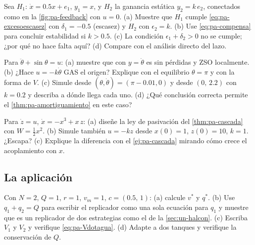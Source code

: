 \begin{problema}\label{prob:pa-escasez}
Sea $H_1$: $\dot x=0.5x+e_1$, $y_1=x$, y $H_2$ la ganancia estática $y_2=k\,e_2$, conectados como en la \cref{fig:pa-feedback} con $u=0$. (a) Muestre que $H_1$ cumple \eqref{eq:pa-excesoescasez} con $\delta_1=-0.5$ (escasez) y $H_2$ con $\epsilon_2=k$. (b) Use \eqref{eq:pa-compensa} para concluir estabilidad si $k>0.5$. (c) La condición $\epsilon_1+\delta_2>0$ no se cumple; ¿por qué no hace falta aquí? (d) Compare con el análisis directo del lazo.
\end{problema}

\begin{problema}\label{prob:pa-penduloPBC}
Para $\ddot\theta+\sin\theta=u$: (a) muestre que con $y=\dot\theta$ es sin pérdidas y ZSO localmente. (b) ¿Hace $u=-k\dot\theta$ GAS el origen? Explique con el equilibrio $\theta=\pi$ y con la forma de $V$. (c) \etiquetaM{} Simule desde $(\theta,\dot\theta)=(\pi-0.01,0)$ y desde $(0,\,2.2)$ con $k=0.2$ y describa a dónde llega cada uno. (d) ¿Qué conclusión correcta permite el \cref{thm:pa-amortiguamiento} en este caso?
\end{problema}

\begin{problema}\label{prob:pa-cascada2}
Para $\dot z=u$, $\dot x=-x^3+x\,z$: (a) diseñe la ley de pasivación del \cref{thm:pa-cascada} con $W=\tfrac12x^2$. (b) \etiquetaM{} Simule también $u=-kz$ desde $x(0)=1$, $z(0)=10$, $k=1$. ¿Escapa? (c) Explique la diferencia con el \cref{ej:pa-cascada} mirando cómo crece el acoplamiento con $x$.
\end{problema}

\subsection*{La aplicación}

\begin{problema}\label{prob:pa-dostanques}
Con $N=2$, $Q=1$, $r=1$, $v_m=1$, $c=(0.5,\,1)$: (a) calcule $v^*$ y $q^*$. (b) Use $q_1+q_2=Q$ para escribir el replicador como una sola ecuación para $q_1$ y muestre que es un replicador de dos estrategias como el de la \cref{sec:un-halcon}. (c) Escriba $V_1$ y $V_2$ y verifique \eqref{eq:pa-Vdotagua}. (d) \etiquetaM{} Adapte  a dos tanques y verifique la conservación de $Q$.
\end{problema}

